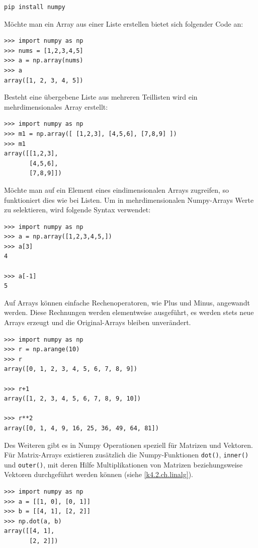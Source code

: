 \documentclass[]{dsadokumentation}
\begin{document}
\begin{verbatim}
pip install numpy
\end{verbatim}

Möchte man ein Array aus einer Liste erstellen bietet sich folgender Code an:

\begin{verbatim}
>>> import numpy as np
>>> nums = [1,2,3,4,5]
>>> a = np.array(nums)
>>> a
array([1, 2, 3, 4, 5])
\end{verbatim}

Besteht eine übergebene Liste aus mehreren Teillisten wird ein mehrdimensionales Array erstellt:

\begin{verbatim}
>>> import numpy as np
>>> m1 = np.array([ [1,2,3], [4,5,6], [7,8,9] ])
>>> m1
array([[1,2,3],
       [4,5,6],
       [7,8,9]])
\end{verbatim}

Möchte man auf ein Element eines eindimensionalen Arrays zugreifen, so funktioniert dies wie bei Listen. Um in mehrdimensionalen Numpy-Arrays Werte zu selektieren, wird folgende Syntax verwendet:

\begin{verbatim}
>>> import numpy as np
>>> a = np.array([1,2,3,4,5,])
>>> a[3]
4

>>> a[-1]
5
\end{verbatim}

Auf Arrays können einfache Rechenoperatoren, wie Plus und Minus, angewandt werden. Diese Rechnungen werden elementweise ausgeführt, es werden stets neue Arrays erzeugt und die Original-Arrays bleiben unverändert.

\begin{verbatim}
>>> import numpy as np
>>> r = np.arange(10)
>>> r
array([0, 1, 2, 3, 4, 5, 6, 7, 8, 9])

>>> r+1
array([1, 2, 3, 4, 5, 6, 7, 8, 9, 10])

>>> r**2
array([0, 1, 4, 9, 16, 25, 36, 49, 64, 81])
\end{verbatim}

Des Weiteren gibt es in Numpy Operationen speziell für Matrizen und Vektoren.
Für Matrix-Arrays existieren zusätzlich die Numpy-Funktionen \verb|dot()|, \verb|inner()| und \verb|outer()|, mit deren Hilfe Multiplikationen von Matrizen beziehungsweise Vektoren durchgeführt werden können (siehe \cref{k4.2.ch.linalg}).

\begin{verbatim}
>>> import numpy as np
>>> a = [[1, 0], [0, 1]]
>>> b = [[4, 1], [2, 2]]
>>> np.dot(a, b)
array([[4, 1],
       [2, 2]])
\end{verbatim}
\end{document}

